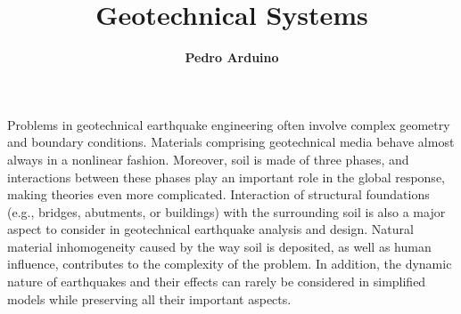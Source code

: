%
%
%


%
%
%
%
%
%
%
%

\title{Geotechnical Systems}
\author{
    \textbf{Pedro Arduino}}
\tocauthor{}
%
%
\maketitle

Problems in geotechnical earthquake engineering often involve complex geometry and boundary conditions. Materials comprising geotechnical media behave almost always in a nonlinear fashion. Moreover, soil is made of three phases, and interactions between these phases play an important role in the global response, making theories even more complicated. Interaction of structural foundations (e.g., bridges, abutments, or buildings) with the surrounding soil is also a major aspect to consider in geotechnical earthquake analysis and design. Natural material inhomogeneity caused by the way soil is deposited, as well as human inﬂuence, contributes to the complexity of the problem. In addition, the dynamic nature of earthquakes and their eﬀects can rarely be considered in simpliﬁed models while preserving all their important aspects.

